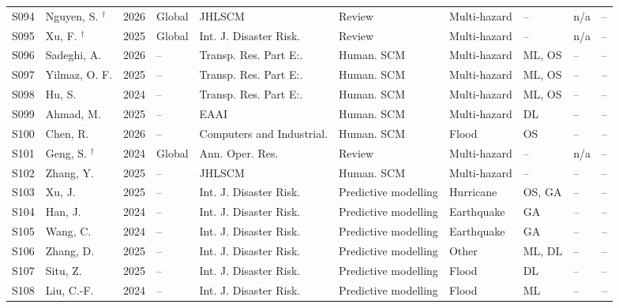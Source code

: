 \begin{landscape}
\begin{longtable}{@{}p{1.0cm}p{3.3cm}p{0.8cm}p{2.3cm}p{3.1cm}p{2.6cm}p{2.2cm}p{1.9cm}p{2.3cm}p{2.2cm}@{}}
S094 & Nguyen, S. \cite{Nguyen2026MachineLearningHumanitarian}$^{\dagger}$ & 2026 & Global & JHLSCM & Review & Multi-hazard & -- & n/a & -- \\
S095 & Xu, F. \cite{Xu2025LLMDisasterManagement}$^{\dagger}$ & 2025 & Global & Int. J. Disaster Risk. & Review & Multi-hazard & -- & n/a & -- \\
S096 & Sadeghi, A. \cite{Sadeghi2026MLStochasticRouting} & 2026 & -- & Transp. Res. Part E:. & Human. SCM & Multi-hazard & ML, OS & -- & -- \\
S097 & Yilmaz, O. F. \cite{Yilmaz2025ResilientHumanitarianML} & 2025 & -- & Transp. Res. Part E:. & Human. SCM & Multi-hazard & ML, OS & -- & -- \\
S098 & Hu, S. \cite{Hu2024MachineLearningSupplierRelief} & 2024 & -- & Transp. Res. Part E:. & Human. SCM & Multi-hazard & ML, OS & -- & -- \\
S099 & Ahmad, M. \cite{Ahmad2025DeepRLReliefDistribution} & 2025 & -- & EAAI & Human. SCM & Multi-hazard & DL & -- & -- \\
S100 & Chen, R. \cite{Chen2026FloodHumanitarianDataDriven} & 2026 & -- & Computers and Industrial. & Human. SCM & Flood & OS & -- & -- \\
S101 & Geng, S. \cite{Geng2024ResourceManagementReview}$^{\dagger}$ & 2024 & Global & Ann. Oper. Res. & Review & Multi-hazard & -- & n/a & -- \\
S102 & Zhang, Y. \cite{Zhang2025PredictiveAnalyticsHumanitarian} & 2025 & -- & JHLSCM & Human. SCM & Multi-hazard & -- & -- & -- \\
S103 & Xu, J. \cite{Xu2025LargeLanguageAgentHousehold} & 2025 & -- & Int. J. Disaster Risk. & Predictive modelling & Hurricane & OS, GA & -- & -- \\
S104 & Han, J. \cite{Han2024EnhancedEarthquakeImpact} & 2024 & -- & Int. J. Disaster Risk. & Predictive modelling & Earthquake & GA & -- & -- \\
S105 & Wang, C. \cite{Wang2024NearRealTimeFatalityEstimation} & 2024 & -- & Int. J. Disaster Risk. & Predictive modelling & Earthquake & GA & -- & -- \\
S106 & Zhang, D. \cite{Zhang2025TornadoGraphNeuralNetworks} & 2025 & -- & Int. J. Disaster Risk. & Predictive modelling & Other & ML, DL & -- & -- \\
S107 & Situ, Z. \cite{Situ2025AttentionFloodDamageRisk} & 2025 & -- & Int. J. Disaster Risk. & Predictive modelling & Flood & DL & -- & -- \\
S108 & Liu, C.-F. \cite{Liu2024FloodDamageCastNowcasting} & 2024 & -- & Int. J. Disaster Risk. & Predictive modelling & Flood & ML & -- & -- \\

\end{longtable}
\end{landscape}
